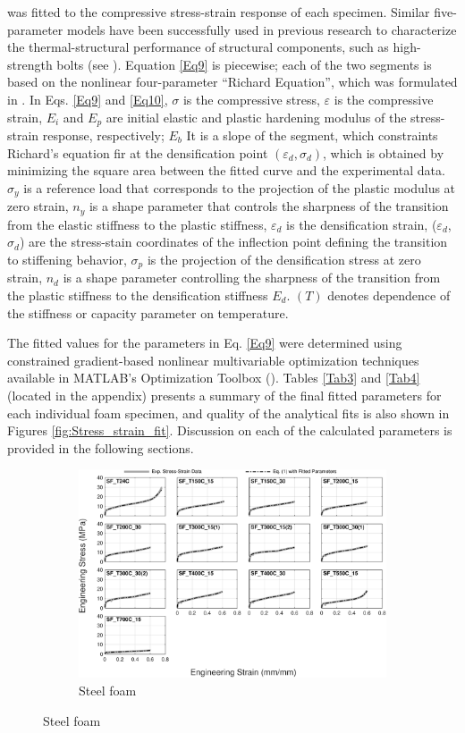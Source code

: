\documentclass[review]{elsarticle}
\begin{document}
{was fitted to the compressive stress-strain response of each specimen. Similar five-parameter models have been successfully used in previous research to characterize the thermal-structural performance of structural components, such as high-strength bolts (see \cite{Wei2018}). Equation \ref{Eq9} is piecewise; each of the two segments is based on the nonlinear four-parameter “Richard Equation”, which was formulated in \cite{Ric1975}. In Eqs. \ref{Eq9} and \ref{Eq10}, $\sigma$ is the compressive stress, $\varepsilon$ is the compressive strain, $E_i$ and $E_p$ are initial elastic and plastic hardening modulus of the stress-strain response, respectively; $E_b$ It is a slope of the segment, which constraints Richard's equation fir at the densification point $(\varepsilon_d,\sigma_d)$, which is obtained by minimizing the square area between the fitted curve and the experimental data. $\sigma_y$ is a reference load that corresponds to the projection of the plastic modulus at zero strain, $n_y$ is a shape parameter that controls the sharpness of the transition from the elastic stiffness to the plastic stiffness, $\varepsilon_d$ is the densification strain, ($\varepsilon_d$, $\sigma_d$) are the stress-stain coordinates of the inflection point defining the transition to stiffening behavior, $\sigma_p$ is the projection of the densification stress at zero strain, $n_d$ is a shape parameter controlling the sharpness of the transition from the plastic stiffness to the densification stiffness $E_d$. $(T)$ denotes dependence of the stiffness or capacity parameter on temperature.

The fitted values for the parameters in Eq. \ref{Eq9} were determined using constrained gradient-based nonlinear multivariable optimization techniques available in MATLAB’s Optimization Toolbox (\cite{Mat}). Tables \ref{Tab3} and \ref{Tab4} (located in the appendix) presents a summary of the final fitted parameters for each individual foam specimen, and quality of the analytical fits is also shown in Figures \ref{fig:Stress_strain_fit}. Discussion on each of the calculated parameters is provided in the following sections.

\begin{figure}
	\centering
	\begin{subfigure}{1.00\textwidth}
		\centering
		\includegraphics[width=0.90\linewidth]
		{Tex-Figures/Fig15a-StressStrain-fit-Fe.pdf}
		\caption{Steel foam}
		\label{fig:StressStrain_Rich_Steel}
	\end{subfigure}


\end{figure}}
\end{document}
